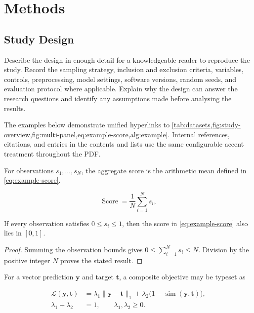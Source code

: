 \section{Methods}
\label{sec:study-one-methods}

\subsection{Study Design}

Describe the design in enough detail for a knowledgeable reader to reproduce the
study. Record the sampling strategy, inclusion and exclusion criteria, variables,
controls, preprocessing, model settings, software versions, random seeds, and
evaluation protocol where applicable. Explain why the design can answer the
research questions and identify any assumptions made before analysing the results.

The examples below demonstrate unified hyperlinks to \cref{tab:datasets,fig:study-overview,fig:multi-panel,eq:example-score,alg:example}. Internal references, citations, and entries in the contents and lists use the same configurable accent treatment throughout the PDF.

\begin{definition}
For observations $s_1,\ldots,s_N$, the aggregate score is the arithmetic mean defined in \cref{eq:example-score}.
\end{definition}

\begin{equation}
  \operatorname{Score}=\frac{1}{N}\sum_{i=1}^{N}s_i,
  \label{eq:example-score}
\end{equation}

\begin{proposition}
If every observation satisfies $0\leq s_i\leq 1$, then the score in
\cref{eq:example-score} also lies in $[0,1]$.
\end{proposition}

\begin{proof}
Summing the observation bounds gives $0\leq\sum_{i=1}^{N}s_i\leq N$.
Division by the positive integer $N$ proves the stated result.
\end{proof}

For a vector prediction $\bm{y}$ and target $\bm{t}$, a composite objective may be typeset as

\begin{align}
  \mathcal{L}(\bm{y},\bm{t})
    &= \lambda_1 \lVert \bm{y}-\bm{t} \rVert_1
     + \lambda_2 \bigl(1-\operatorname{sim}(\bm{y},\bm{t})\bigr), \\
  \lambda_1+\lambda_2 &= 1, \qquad \lambda_1,\lambda_2 \ge 0.
\end{align}

